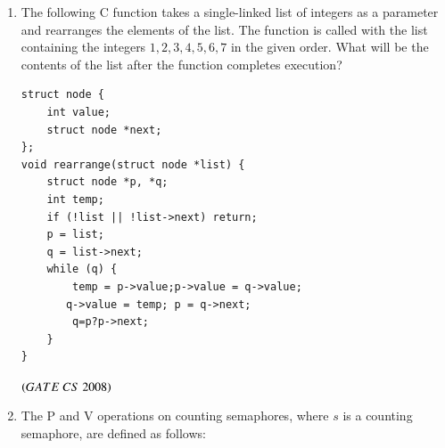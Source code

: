 \documentclass[journal]{IEEEtran}
\numberwithin{equation}{enumi}
\numberwithin{figure}{enumi}
\begin{document}
\begin{enumerate}
\begin{verbatim}
int main() {
    printf("Enter Text"); printf("\n");
    reverse(); printf("\n");
}
\end{verbatim}

\begin{enumerate}
\item \texttt{?1: (getchar() != '\textbackslash n')} \\
      \texttt{?2: getchar(c);}
\item \texttt{?1: (c = getchar()) != '\textbackslash n'} \\
      \texttt{?2: getchar(c);}
\item \texttt{?1: (c != '\textbackslash n')} \\
      \texttt{?2: putchar(c);}
\item \texttt{?1: ((c = getchar()) != '\textbackslash n')} \\
      \texttt{?2: putchar(c);}
\end{enumerate}
\hfill $\brak{GATE\ CS\  2008}$
 

\item The following C function takes a single-linked list of integers as a parameter and rearranges the elements of the list. 
The function is called with the list containing the integers $1,2,3,4,5,6,7$ in the given order. 
What will be the contents of the list after the function completes execution?

\begin{verbatim}
struct node {
    int value;
    struct node *next;
};
void rearrange(struct node *list) {
    struct node *p, *q;
    int temp;
    if (!list || !list->next) return;
    p = list; 
    q = list->next;
    while (q) {
        temp = p->value;p->value = q->value; 
       q->value = temp; p = q->next;
        q=p?p->next;    
    }
}
\end{verbatim}

\begin{enumerate}
\end{enumerate}
\hfill $\brak{GATE\ CS\  2008}$

\item The P and V operations on counting semaphores, where $s$ is a counting semaphore, are defined as follows:


\end{enumerate}
\end{document}
